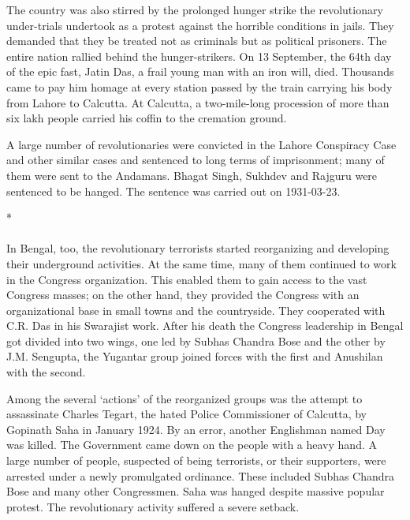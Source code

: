 \begin{multicols}{2}
The country was also stirred by the prolonged hunger strike the revolutionary under-trials undertook as a protest against the horrible conditions in jails. They demanded that they be treated not as criminals but as political prisoners. The entire nation rallied behind the hunger-strikers. On 13 September, the 64th day of the epic fast, Jatin Das, a frail young man with an iron will, died. Thousands came to pay him homage at every station passed by the train carrying his body from Lahore to Calcutta. At Calcutta, a two-mile-long procession of more than six lakh people carried his coffin to the cremation ground.

A large number of revolutionaries were convicted in the Lahore Conspiracy Case and other similar cases and sentenced to long terms of imprisonment; many of them were sent to the Andamans. Bhagat Singh, Sukhdev and Rajguru were sentenced to be hanged. The sentence was carried out on 1931-03-23.

\begin{center}*\end{center}

\paragraph*{}

In Bengal, too, the revolutionary terrorists started reorganizing and developing their underground activities. At the same time, many of them continued to work in the Congress organization. This enabled them to gain access to the vast Congress masses; on the other hand, they provided the Congress with an organizational base in small towns and the countryside. They cooperated with C.R. Das in his Swarajist work. After his death the Congress leadership in Bengal got divided into two wings, one led by Subhas Chandra Bose and the other by J.M. Sengupta, the Yugantar group joined forces with the first and Anushilan with the second.

Among the several `actions' of the reorganized groups was the attempt to assassinate Charles Tegart, the hated Police Commissioner of Calcutta, by Gopinath Saha in January 1924. By an error, another Englishman named Day was killed. The Government came down on the people with a heavy hand. A large number of people, suspected of being terrorists, or their supporters, were arrested under a newly promulgated ordinance. These included Subhas Chandra Bose and many other Congressmen. Saha was hanged despite massive popular protest. The revolutionary activity suffered a severe setback.


\end{multicols}
